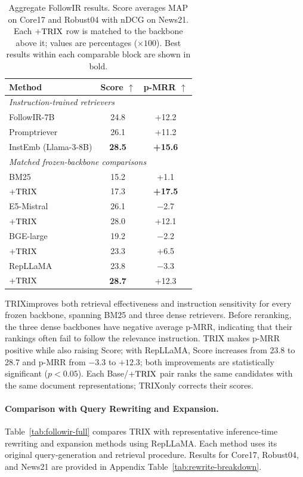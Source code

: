 \documentclass[letterpaper]{article}
\newcommand{\method}{\ifmmode \mathrm{TRIX}\else TRIX\xspace\fi}
\begin{document}
\begin{table}[t]
\centering
\small
\setlength{\tabcolsep}{5pt}
\begin{tabular}{lcc}
\toprule
\textbf{Method} & \textbf{Score $\uparrow$} & \textbf{p-MRR $\uparrow$} \\
\midrule
\multicolumn{3}{l}{\emph{Instruction-trained retrievers}} \\
FollowIR-7B & 24.8 & +12.2 \\
Promptriever & 26.1 & +11.2 \\
InstEmb (Llama-3-8B) & \textbf{28.5} & \textbf{+15.6} \\
\midrule
\multicolumn{3}{l}{\emph{Matched frozen-backbone comparisons}} \\
BM25 & 15.2 & +1.1 \\
\quad $+\method$ & 17.3 & \textbf{+17.5} \\
\addlinespace[2pt]
E5-Mistral & 26.1 & $-$2.7 \\
\quad $+\method$ & 28.0 & +12.1 \\
\addlinespace[2pt]
BGE-large & 19.2 & $-$2.2 \\
\quad $+\method$ & 23.3 & +6.5 \\
\addlinespace[2pt]
RepLLaMA & 23.8 & $-$3.3 \\
\quad $+\method$ & \textbf{28.7} & +12.3 \\
\bottomrule
\end{tabular}
\caption{Aggregate FollowIR results.  Score averages MAP on Core17 and
Robust04 with nDCG on News21.  Each $+\method$ row is matched to the backbone
above it; values are percentages ($\times100$).  Best results within each
comparable block are shown in bold.}
\label{tab:followir-main}
\end{table}

\method improves both retrieval effectiveness and instruction sensitivity for
every frozen backbone, spanning BM25 and three dense retrievers.  Before
reranking, the three dense backbones have negative average p-MRR, indicating
that their rankings often fail to follow the relevance instruction.  \method
makes p-MRR positive while also raising Score; with RepLLaMA, Score increases
from 23.8 to 28.7 and p-MRR from $-3.3$ to $+12.3$; both improvements are
statistically significant ($p<0.05$).
Each Base/$+\method$ pair ranks the same candidates with the same document
representations; \method only corrects their scores.

\paragraph{Comparison with Query Rewriting and Expansion.}
\label{sec:rewrite-comparison}
Table~\ref{tab:followir-full} compares \method{} with representative
inference-time rewriting and expansion methods using RepLLaMA.  Each method
uses its original query-generation and retrieval procedure.  Results for
Core17, Robust04, and News21 are provided in Appendix
Table~\ref{tab:rewrite-breakdown}.
\end{document}
